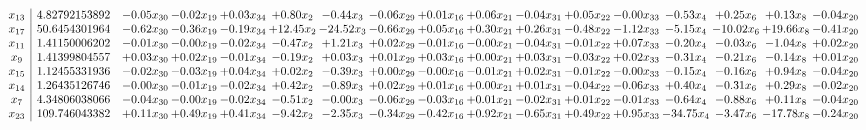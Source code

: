\documentclass[9pt]{article}
\begin{document}
 \[\begin{array}{c| c c@{\hskip 2pt} c@{\hskip 2pt} c@{\hskip 2pt} c@{\hskip 2pt} c@{\hskip 2pt} c@{\hskip 2pt} c@{\hskip 2pt} c@{\hskip 2pt} c@{\hskip 2pt} c@{\hskip 2pt} c@{\hskip 2pt} c@{\hskip 2pt} c@{\hskip 2pt} c@{\hskip 2pt} c@{\hskip 2pt} }
 x_{13}   &  4.82792153892 & -0.05 x_{30} & -0.02 x_{19} & +  0.03 x_{34} & +  0.80 x_{2} & -0.44 x_{3} & -0.06 x_{29} & +  0.01 x_{16} & +  0.06 x_{21} & -0.04 x_{31} & +  0.05 x_{22} & -0.00 x_{33} & -0.53 x_{4} & +  0.25 x_{6} & +  0.13 x_{8} & -0.04 x_{20}\\
 x_{17}   &  50.6454301964 & -0.62 x_{30} & -0.36 x_{19} & -0.19 x_{34} & + 12.45 x_{2} & -24.52 x_{3} & -0.66 x_{29} & +  0.05 x_{16} & +  0.30 x_{21} & +  0.26 x_{31} & -0.48 x_{22} & -1.12 x_{33} & -5.15 x_{4} & -10.02 x_{6} & + 19.66 x_{8} & -0.41 x_{20}\\
 x_{11}   &  1.41150006202 & -0.01 x_{30} & -0.00 x_{19} & -0.02 x_{34} & -0.47 x_{2} & +  1.21 x_{3} & +  0.02 x_{29} & -0.01 x_{16} & -0.00 x_{21} & -0.04 x_{31} & -0.01 x_{22} & +  0.07 x_{33} & -0.20 x_{4} & -0.03 x_{6} & -1.04 x_{8} & +  0.02 x_{20}\\
 x_{9}   &  1.41399804557 & +  0.03 x_{30} & +  0.02 x_{19} & -0.01 x_{34} & -0.19 x_{2} & +  0.03 x_{3} & +  0.01 x_{29} & +  0.03 x_{16} & +  0.00 x_{21} & +  0.03 x_{31} & -0.03 x_{22} & +  0.02 x_{33} & -0.31 x_{4} & -0.21 x_{6} & -0.14 x_{8} & +  0.01 x_{20}\\
 x_{15}   &  1.12455331936 & -0.02 x_{30} & -0.03 x_{19} & +  0.04 x_{34} & +  0.02 x_{2} & -0.39 x_{3} & +  0.00 x_{29} & -0.00 x_{16} & -0.01 x_{21} & +  0.02 x_{31} & -0.01 x_{22} & -0.00 x_{33} & -0.15 x_{4} & -0.16 x_{6} & +  0.94 x_{8} & -0.04 x_{20}\\
 x_{14}   &  1.26435126746 & -0.00 x_{30} & -0.01 x_{19} & -0.02 x_{34} & +  0.42 x_{2} & -0.89 x_{3} & +  0.02 x_{29} & +  0.01 x_{16} & +  0.00 x_{21} & +  0.01 x_{31} & -0.04 x_{22} & -0.06 x_{33} & +  0.40 x_{4} & -0.31 x_{6} & +  0.29 x_{8} & -0.02 x_{20}\\
 x_{7}   &  4.34806038066 & -0.04 x_{30} & -0.00 x_{19} & -0.02 x_{34} & -0.51 x_{2} & -0.00 x_{3} & -0.06 x_{29} & -0.03 x_{16} & +  0.01 x_{21} & -0.02 x_{31} & +  0.01 x_{22} & -0.01 x_{33} & -0.64 x_{4} & -0.88 x_{6} & +  0.11 x_{8} & -0.04 x_{20}\\
 x_{23}   &  109.746043382 & +  0.11 x_{30} & +  0.49 x_{19} & +  0.41 x_{34} & -9.42 x_{2} & -2.35 x_{3} & -0.34 x_{29} & -0.42 x_{16} & +  0.92 x_{21} & -0.65 x_{31} & +  0.49 x_{22} & +  0.95 x_{33} & -34.75 x_{4} & -3.47 x_{6} & -17.78 x_{8} & -0.24 x_{20}\\

\end{array}\]
\end{document}
